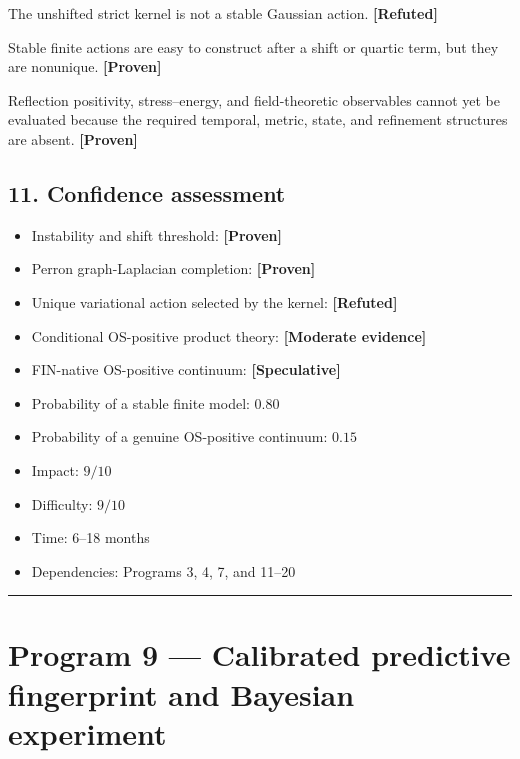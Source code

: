 \documentclass[11pt,a4paper,openany]{report}
\newcommand{\statusProven}{\textcolor{fingreen}{[Proven]}}
\newcommand{\statusModerate}{\textcolor{finviolet}{[Moderate evidence]}}
\newcommand{\statusSpeculative}{\textcolor{finorange}{[Speculative]}}
\newcommand{\statusRefuted}{\textcolor{finred}{[Refuted]}}
\begin{document}
The unshifted strict kernel is not a stable Gaussian action. \textbf{\statusRefuted{}}

Stable finite actions are easy to construct after a shift or quartic term, but they are nonunique. \textbf{\statusProven{}}

Reflection positivity, stress–energy, and field-theoretic observables cannot yet be evaluated because the required temporal, metric, state, and refinement structures are absent. \textbf{\statusProven{}}

\section{11. Confidence assessment}

\begin{itemize}
\item 
Instability and shift threshold: \textbf{\statusProven{}}

\item 
Perron graph-Laplacian completion: \textbf{\statusProven{}}

\item 
Unique variational action selected by the kernel: \textbf{\statusRefuted{}}

\item 
Conditional OS-positive product theory: \textbf{\statusModerate{}}

\item 
FIN-native OS-positive continuum: \textbf{\statusSpeculative{}}

\item 
Probability of a stable finite model: \(0.80\)

\item 
Probability of a genuine OS-positive continuum: \(0.15\)

\item 
Impact: \(9/10\)

\item 
Difficulty: \(9/10\)

\item 
Time: 6–18 months

\item 
Dependencies: Programs 3, 4, 7, and 11–20

\end{itemize}

\par\medskip\hrule\medskip

\chapter{Program 9 — Calibrated predictive fingerprint and Bayesian experiment}
\end{document}

